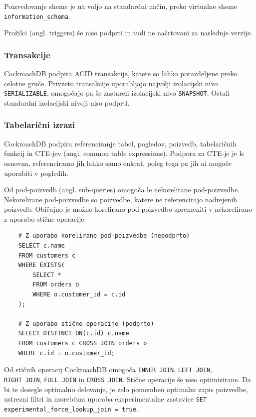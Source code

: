 \documentclass[a4paper, 12pt]{book}
\begin{document}
Poizvedovanje sheme je na voljo na standardni način, preko virtualne sheme \texttt{information\_schema}.

Prožilci (angl. triggers) še niso podprti in tudi ne načrtovani za naslednje verzije.

\subsubsection{Transakcije}
CockroachDB podpira ACID transakcije, katere so lahko porazdeljene preko celotne gruče. Privzeto transakcije uporabljajo najvišji izolacijski nivo \texttt{SERI\-ALIZABLE}, omogočajo pa še zastareli izolacijski nivo \texttt{SNAPSHOT}. Ostali standardni izolacijski nivoji niso podprti.

\subsubsection{Tabelarični izrazi}
CockroachDB podpira referenciranje tabel, pogledov, poizvedb, tabelaričnih funkcij in CTE-jev (angl. common table expressions). Podpora za CTE-je je le osnovna, referenciramo jih lahko samo enkrat, poleg tega pa jih ni mogoče uporabiti v pogledih.

Od pod-poizvedb (angl. sub-queries) omogoča le nekorelirane pod-poiz\-vedbe. Nekorelirane pod-poizvedbe so poizvedbe, katere ne referencirajo nadrejenih poizvedb. Običajno je možno korelirano pod-poizvedbo spremeniti v nekorelirano z uporabo stične operacije:

\begin{listing}[H]
\begin{verbatim}
    # Z uporabo korelirane pod-poizvedbe (nepodprto)
    SELECT c.name
    FROM customers c
    WHERE EXISTS(
        SELECT *
        FROM orders o
        WHERE o.customer_id = c.id
    );

    # Z uporabo stične operacije (podprto)
    SELECT DISTINCT ON(c.id) c.name
    FROM customers c CROSS JOIN orders o
    WHERE c.id = o.customer_id;
\end{verbatim}
\label{code-correlated-sub-queries}
\end{listing}

Od stičnih operacij CockroachDB omogoča \texttt{INNER JOIN}, \texttt{LEFT JOIN},\\\texttt{RIGHT JOIN}, \texttt{FULL JOIN} in \texttt{CROSS JOIN}. Stične operacije še niso optimizirane. Da bi te dosegle optimalno delovanje, je zelo pomemben optimalni zapis poizvedbe, ustrezni filtri in morebitna uporaba eksperimentalne zastavice \texttt{SET experimental\_force\_lookup\_join = true}.
\end{document}
